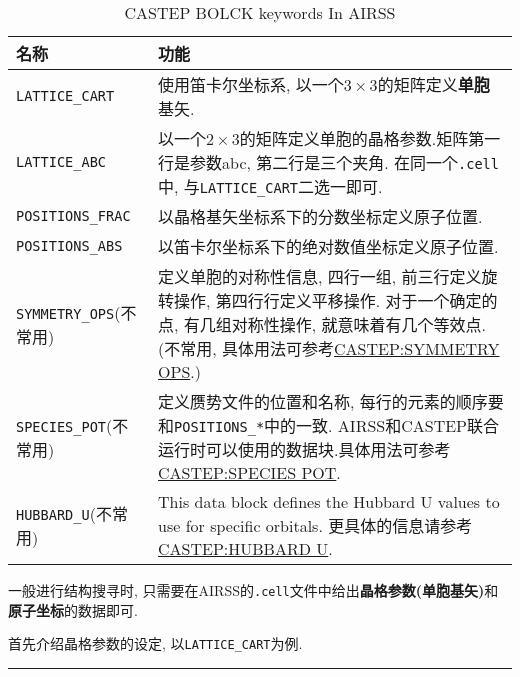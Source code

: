 \documentclass[a4paper, 10pt]{article}
\begin{document}
        \begin{table}
          \centering
          \caption{CASTEP BOLCK keywords In AIRSS}
          \label{BLOCK_keywords}  
          \begin{tabular}{p{13em}|p{19em}}
            \toprule
            名称 & 功能\\
            \midrule
            \verb|LATTICE_CART|  & 使用笛卡尔坐标系, 以一个\(3\times3\)的矩阵定义\textbf{单胞}基矢.\\
            \midrule
            \verb|LATTICE_ABC| & 以一个\(2\times3\)的矩阵定义单胞的晶格参数.矩阵第一行是参数abc, 第二行是三个夹角. 在同一个\verb|.cell|中, 与\verb|LATTICE_CART|二选一即可.\\
            \midrule
            \verb|POSITIONS_FRAC| & 以晶格基矢坐标系下的分数坐标定义原子位置.\\
            \midrule
            \verb|POSITIONS_ABS| & 以笛卡尔坐标系下的绝对数值坐标定义原子位置.\\
            \midrule
            \verb|SYMMETRY_OPS|(不常用) & 定义单胞的对称性信息, 四行一组, 前三行定义旋转操作, 第四行行定义平移操作. 对于一个确定的点, 有几组对称性操作, 就意味着有几个等效点.(不常用, 具体用法可参考\href{http://www.tcm.phy.cam.ac.uk/castep/documentation/WebHelp/content/modules/castep/keywords/k_symmetry_ops_castep.htm}{CASTEP:SYMMETRY OPS}.)\\
            \midrule
            \verb|SPECIES_POT|(不常用) & 定义赝势文件的位置和名称, 每行的元素的顺序要和\verb|POSITIONS_*|中的一致. AIRSS和CASTEP联合运行时可以使用的数据块.具体用法可参考\href{http://www.tcm.phy.cam.ac.uk/castep/documentation/WebHelp/content/modules/castep/keywords/k_species_pot_castep.htm}{CASTEP:SPECIES POT}.\\
            \midrule
            \verb|HUBBARD_U|(不常用)& This data block defines the Hubbard U values to use for specific orbitals. 更具体的信息请参考\href{http://www.tcm.phy.cam.ac.uk/castep/documentation/WebHelp/content/modules/castep/keywords/k_hubbard_u_castep.htm}{CASTEP:HUBBARD U}.\\
            \bottomrule
          \end{tabular} 
        \end{table}
        一般进行结构搜寻时, 只需要在AIRSS的\verb|.cell|文件中给出\textbf{晶格参数(单胞基矢)}和\textbf{原子坐标}的数据即可.
        
        首先介绍晶格参数的设定, 以\verb|LATTICE_CART|为例.\\
        \rule{\textwidth}{0.3mm}
\end{document}
